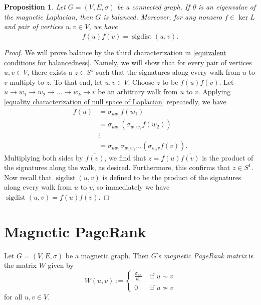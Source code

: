 \documentclass{article}
\newtheorem{prop}[thm]{Proposition}
\theoremstyle{definition}
\DeclareMathOperator{\sigdist}{sigdist}
\begin{document}
\begin{prop}\label{properties of connected graph with 0 eigenvalue}
    Let $G = (V, E, \sigma)$ be a connected graph. If 0 is an eigenvalue of the magnetic Laplacian, then $G$ is balanced. Moreover, for any nonzero $f \in \ker L$ and pair of vertices $u, v \in V$, we have 
    $$
        f(u) \overline{f(v)} = \sigdist (u, v).
    $$
\end{prop}
\begin{proof}
We will prove balance by the third characterization in \cref{equivalent conditions for balancedness}. Namely, we will show that for every pair of vertices $u, v \in V$, there exists a $z \in S^1$ such that the signatures along every walk from $u$ to $v$ multiply to $z$. To that end, let $u, v \in V$. Choose $z$ to be $f(u) \overline{f(v)}$. Let $u \rightarrow w_1 \rightarrow w_2 \rightarrow \dots \rightarrow w_k \rightarrow v$ be an arbitrary walk from $u$ to $v$. Applying \cref{equality characterization of null space of Laplacian} repeatedly, we have
\begin{align*}
    f(u) 
    &= \sigma_{u w_1} f(w_1) \\
    &= \sigma_{u w_1} (\sigma_{w_1 w_2} f(w_2)) \\
    &\vdots \\
    &= \sigma_{u w_1} \sigma_{w_1 w_2} \dots (\sigma_{w_k v} f(v)).
\end{align*}
Multiplying both sides by $\overline{f(v)}$, we find that $z = f(u) \overline{f(v)}$ is the product of the signatures along the walk, as desired. Furthermore, this confirms that $z \in S^1$. Now recall that $\sigdist(u, v)$ is defined to be the product of the signatures along every walk from $u$ to $v$, so immediately we have $\sigdist (u, v) = f(u) \overline{f(v)}$.
\end{proof}

\section{Magnetic PageRank}

Let $G=(V, E, \sigma)$ be a magnetic graph. Then $G$'s \textit{magnetic PageRank matrix} is the matrix $W$ given by
$$
W(u, v) := 
\begin{cases}
\frac{\sigma_{uv}}{d_v} &\text{ if } u \sim v \\
0 &\text{ if } u \not\sim v
\end{cases}
$$
for all $u, v \in V$.
\end{document}
